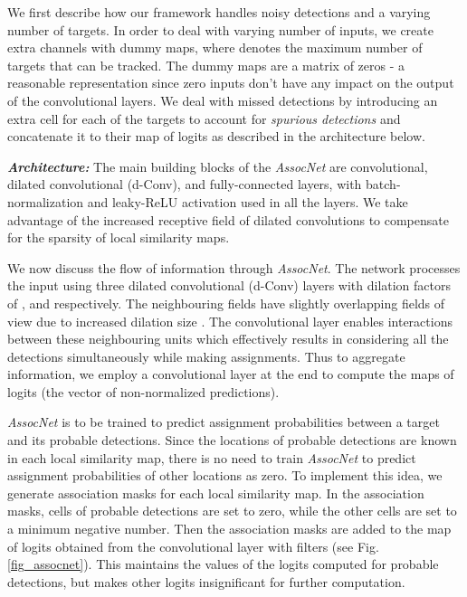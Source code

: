 \documentclass[letterpaper, 10 pt, conference]{ieeeconf}
\begin{document}
\par We first describe how our framework handles noisy detections and a varying number of targets. In order to deal with varying number of inputs, we create  extra channels with dummy maps, where  denotes the maximum number of targets that can be tracked. The dummy maps are a matrix of zeros - a reasonable representation since zero inputs don't have any impact on the output of the convolutional layers. We deal with missed detections by introducing an extra cell for each of the  targets to account for \textit{spurious detections} and concatenate it to their map of logits as described in the architecture below.

\par \textbf{\textit{Architecture:}} The main building blocks of the \textit{AssocNet} are convolutional, dilated convolutional (d-Conv), and fully-connected layers, with batch-normalization and leaky-ReLU activation used in all the layers. We take advantage of the increased receptive field of dilated convolutions \cite{MSCA_DConv} to compensate for the sparsity of local similarity maps.
\par We now discuss the flow of information through \textit{AssocNet}. The network processes the input using three dilated convolutional (d-Conv) layers with dilation factors of , and  respectively. The neighbouring fields have slightly overlapping fields of view due to increased dilation size \cite{Effective_DConv_Segmentation_RSI}. The convolutional layer enables interactions between these neighbouring units which effectively results in considering all the detections simultaneously while making assignments. Thus to aggregate information, we employ a  convolutional layer at the end to compute the maps of logits (the vector of non-normalized predictions).
\par \textit{AssocNet} is to be trained to predict assignment probabilities between a target and its probable detections. Since the locations of probable detections are known in each local similarity map, there is no need to train \textit{AssocNet} to predict assignment probabilities of other locations as zero. To implement this idea, we generate association masks for each local similarity map. In the association masks, cells of probable detections are set to zero, while the other cells are set to a minimum negative number. Then the association masks are added to the map of logits obtained from the convolutional layer with  filters (see Fig.\ref{fig_assocnet}). This maintains the values of the logits computed for probable detections, but makes other logits insignificant for further computation.
\end{document}
